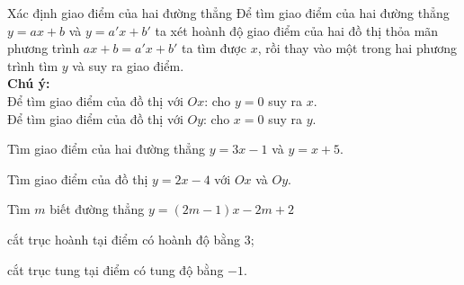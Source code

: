 \begin{dang}{Xác định giao điểm của hai đường thẳng}
	Để tìm giao điểm của hai đường thẳng $y=ax+b$ và $y=a'x+b'$ ta xét hoành độ giao điểm của hai đồ thị thỏa mãn phương trình $ax+b=a'x+b'$ ta tìm được $x$, rồi thay vào một trong hai phương trình tìm $y$ và suy ra giao điểm.\\
	\textbf{Chú ý:} \\
	Để tìm giao điểm của đồ thị với $Ox$: cho $y=0$ suy ra $x$.\\
	Để tìm giao điểm của đồ thị với $Oy$: cho $x=0$ suy ra $y$. 
\end{dang}
\begin{vd}
	Tìm giao điểm của hai đường thẳng $y=3x-1$ và $y=x+5$. 
\end{vd}
\begin{vd}
	Tìm giao điểm của đồ thị $y=2x-4$ với $Ox$ và $Oy$.
\end{vd}
\begin{vd}
	Tìm $m$ biết đường thẳng $y=(2m-1)x-2m+2$
	\begin{enumEX}{1}
		\item cắt trục hoành tại điểm có hoành độ bằng $3$;
		\item cắt trục tung tại điểm có tung độ bằng $-1$.
	\end{enumEX}
\end{vd}
